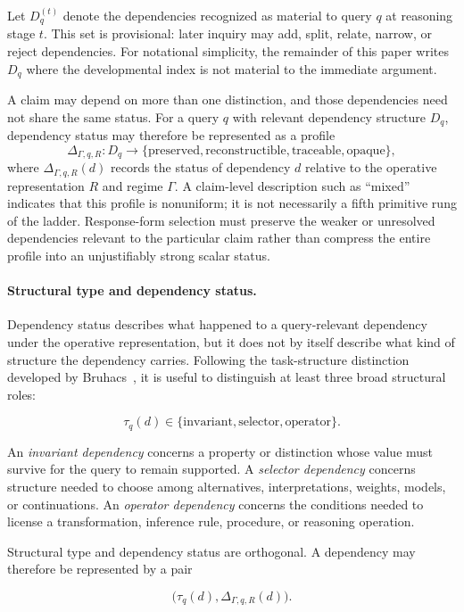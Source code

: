 \documentclass[11pt]{article}
\begin{document}
Let \(D_q^{(t)}\) denote the dependencies recognized as material to query \(q\) at reasoning stage \(t\). This set is provisional: later inquiry may add, split, relate, narrow, or reject dependencies. For notational simplicity, the remainder of this paper writes \(D_q\) where the developmental index is not material to the immediate argument.

A claim may depend on more than one distinction, and those dependencies need not share the same status. For a query \(q\) with relevant dependency structure \(D_q\), dependency status may therefore be represented as a profile
\[
\Delta_{\Gamma,q,R}:D_q
\rightarrow
\{\text{preserved},\text{reconstructible},
\text{traceable},\text{opaque}\},
\]
where \(\Delta_{\Gamma,q,R}(d)\) records the status of dependency \(d\) relative to the operative representation \(R\) and regime \(\Gamma\). A claim-level description such as ``mixed'' indicates that this profile is nonuniform; it is not necessarily a fifth primitive rung of the ladder. Response-form selection must preserve the weaker or unresolved dependencies relevant to the particular claim rather than compress the entire profile into an unjustifiably strong scalar status.

\paragraph{Structural type and dependency status.}
Dependency status describes what happened to a query-relevant dependency under the operative representation, but it does not by itself describe what kind of structure the dependency carries. Following the task-structure distinction developed by Bruhacs~\cite{Bruhacs2026Projection}, it is useful to distinguish at least three broad structural roles:

\[
\tau_q(d)\in
\{\text{invariant},\text{selector},\text{operator}\}.
\]

An \emph{invariant dependency} concerns a property or distinction whose value must survive for the query to remain supported. A \emph{selector dependency} concerns structure needed to choose among alternatives, interpretations, weights, models, or continuations. An \emph{operator dependency} concerns the conditions needed to license a transformation, inference rule, procedure, or reasoning operation.

Structural type and dependency status are orthogonal. A dependency may therefore be represented by a pair

\[
\bigl(\tau_q(d),\Delta_{\Gamma,q,R}(d)\bigr).
\]
\end{document}
